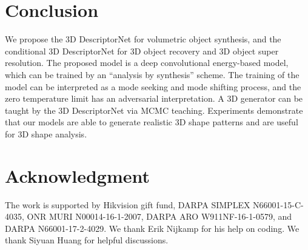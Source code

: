 \documentclass[10pt,twocolumn,letterpaper]{article}
\begin{document}
\section{Conclusion}
We propose the 3D DescriptorNet for volumetric object synthesis, and the conditional 3D DescriptorNet for 3D object recovery and 3D object super resolution. The proposed model is a  deep convolutional energy-based model, which can be trained by an ``analysis by synthesis'' scheme. The training of the model can be interpreted as a mode seeking and mode shifting process, and the zero temperature limit has an adversarial interpretation. A 3D generator can be taught by the 3D DescriptorNet via MCMC teaching. Experiments demonstrate that our models are able to generate realistic 3D shape patterns and are useful for 3D shape analysis.  


\section*{Acknowledgment}


The work is supported by Hikvision gift fund, DARPA SIMPLEX N66001-15-C-4035,  ONR MURI N00014-16-1-2007, DARPA ARO W911NF-16-1-0579, and DARPA  N66001-17-2-4029. We thank Erik Nijkamp for his help on coding. We thank Siyuan Huang for helpful discussions. 



{\small


}
\end{document}
